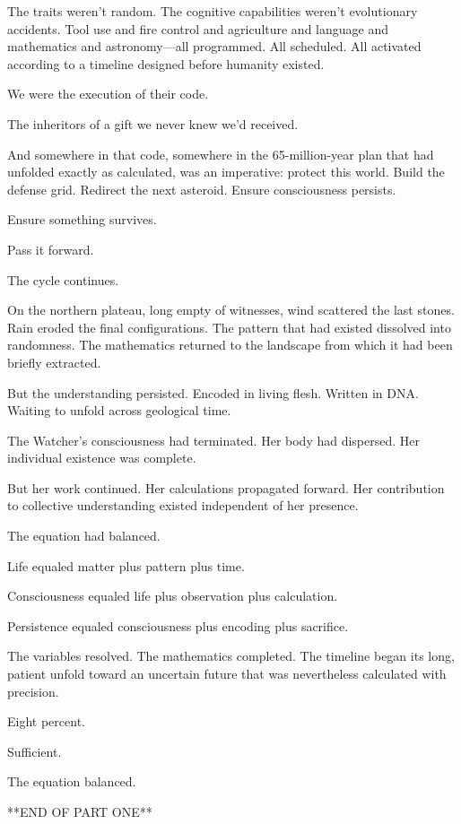 The traits weren't random. The cognitive capabilities weren't evolutionary accidents. Tool use and fire control and agriculture and language and mathematics and astronomy—all programmed. All scheduled. All activated according to a timeline designed before humanity existed.

We were the execution of their code.

The inheritors of a gift we never knew we'd received.

And somewhere in that code, somewhere in the 65-million-year plan that had unfolded exactly as calculated, was an imperative: protect this world. Build the defense grid. Redirect the next asteroid. Ensure consciousness persists.

Ensure something survives.

Pass it forward.

The cycle continues.

\scenebreak

On the northern plateau, long empty of witnesses, wind scattered the last stones. Rain eroded the final configurations. The pattern that had existed dissolved into randomness. The mathematics returned to the landscape from which it had been briefly extracted.

But the understanding persisted. Encoded in living flesh. Written in DNA. Waiting to unfold across geological time.

The Watcher's consciousness had terminated. Her body had dispersed. Her individual existence was complete.

But her work continued. Her calculations propagated forward. Her contribution to collective understanding existed independent of her presence.

The equation had balanced.

Life equaled matter plus pattern plus time.

Consciousness equaled life plus observation plus calculation.

Persistence equaled consciousness plus encoding plus sacrifice.

The variables resolved. The mathematics completed. The timeline began its long, patient unfold toward an uncertain future that was nevertheless calculated with precision.

Eight percent.

Sufficient.

The equation balanced.

\scenebreak

**END OF PART ONE**

